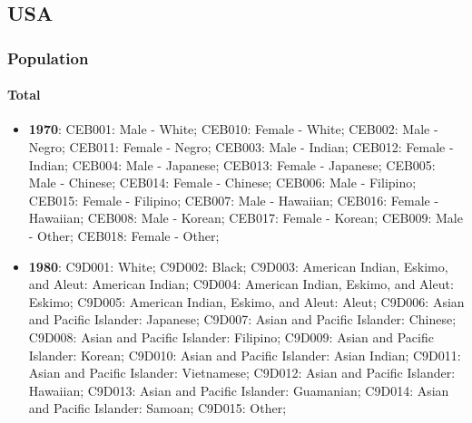 \documentclass[a4paper]{article}
\begin{document}
\subsection{USA}
\subsubsection{Population}
\paragraph{Total}
\begin{itemize}
   \item{\textbf{1970}:  CEB001: Male - White; CEB010: Female - White; CEB002: Male - Negro; CEB011: Female - Negro; CEB003: Male - Indian; CEB012: Female - Indian; CEB004: Male - Japanese; CEB013: Female - Japanese; CEB005: Male - Chinese; CEB014: Female - Chinese; CEB006: Male - Filipino; CEB015: Female - Filipino; CEB007: Male - Hawaiian; CEB016: Female - Hawaiian; CEB008: Male - Korean; CEB017: Female - Korean; CEB009: Male - Other; CEB018: Female - Other;}
   \item{\textbf{1980}:  C9D001: White; C9D002: Black; C9D003: American Indian, Eskimo, and Aleut: American Indian; C9D004: American Indian, Eskimo, and Aleut: Eskimo; C9D005: American Indian, Eskimo, and Aleut: Aleut; C9D006: Asian and Pacific Islander: Japanese; C9D007: Asian and Pacific Islander: Chinese; C9D008: Asian and Pacific Islander: Filipino; C9D009: Asian and Pacific Islander: Korean; C9D010: Asian and Pacific Islander: Asian Indian; C9D011: Asian and Pacific Islander: Vietnamese; C9D012: Asian and Pacific Islander: Hawaiian; C9D013: Asian and Pacific Islander: Guamanian; C9D014: Asian and Pacific Islander: Samoan; C9D015: Other;}

\end{itemize}
\end{document}

